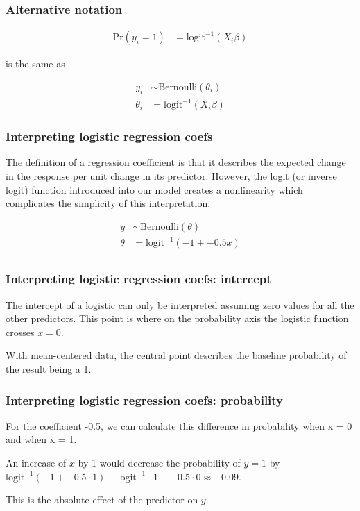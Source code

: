 \documentclass{beamer}
\begin{document}
\begin{frame}
  \frametitle{Alternative notation}

  \begin{align*}
    \text{Pr}(y_{i} = 1) &= \text{logit}^{-1}(X_{i}\beta)
  \end{align*}

  \begin{center}
    is the same as
  \end{center}

  \begin{align*}
    y_{i} &\sim \text{Bernoulli}(\theta_{i}) \\
    \theta_{i} &= \text{logit}^{-1} (X_{i} \beta)
  \end{align*}
\end{frame}

\begin{frame}
  \frametitle{Interpreting logistic regression coefs}

  The definition of a regression coefficient is that it describes the expected change in the response per unit change in its predictor. However, the logit (or inverse logit) function introduced into our model creates a nonlinearity which complicates the simplicity of this interpretation. 

  \begin{align*}
    y &\sim \text{Bernoulli}(\theta) \\
    \theta &= \text{logit}^{-1}(-1 + -0.5 x) \\
  \end{align*}

\end{frame}

\begin{frame}
  \frametitle{Interpreting logistic regression coefs: intercept}

  The intercept of a logistic can only be interpreted assuming zero values for all the other predictors. This point is where on the probability axis the logistic function crosses $x = 0$. 
  
  With mean-centered data, the central point describes the baseline probability of the result being a 1. 
\end{frame}

\begin{frame}
  \frametitle{Interpreting logistic regression coefs: probability}
  For the coefficient -0.5, we can calculate this difference in probability when x = 0 and when x = 1. 
  
  An increase of $x$ by 1 would decrease the probability of $y = 1$ by $\text{logit}^{-1}(-1 + -0.5 \cdot 1) - \text{logit}^{-1}{-1 + -0.5 \cdot 0} \approx -0.09$. 
  
  This is the absolute effect of the predictor on $y$.
\end{frame}
\end{document}
